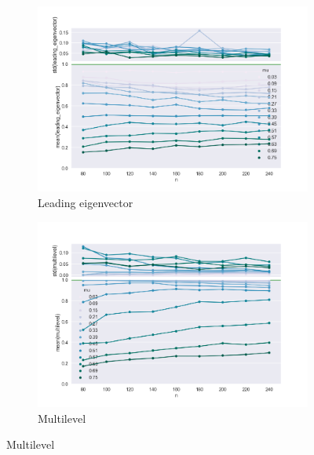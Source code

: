 \begin{figure}
    \begin{subfigure}[b]{0.32\textwidth}
        \includegraphics[width=\textwidth]{fig/nmi_vs_n_leading_eigenvector}
        \caption{Leading eigenvector}
        \label{fig:tiger}
    \end{subfigure}
    \qquad
    \begin{subfigure}[b]{0.32\textwidth}
        \includegraphics[width=\textwidth]{fig/nmi_vs_n_multilevel}
        \caption{Multilevel}
        \label{fig:mouse}
    \end{subfigure}


\end{figure}
